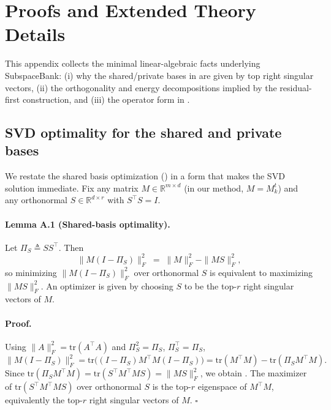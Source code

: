 \documentclass{article}
\theoremstyle{plain}
\theoremstyle{definition}
\theoremstyle{remark}
\begin{document}
\section{Proofs and Extended Theory Details}
\label{sec:appendix-theory}

This appendix collects the minimal linear-algebraic facts underlying SubspaceBank: (i) why the shared/private bases in  are given by top right singular vectors, (ii) the orthogonality and energy decompositions implied by the residual-first construction, and (iii) the operator form in .

\subsection{SVD optimality for the shared and private bases}
\label{sec:appendix-svd-opt}

We restate the shared basis optimization () in a form that makes the SVD solution immediate. Fix any matrix $M\in\mathbb{R}^{m\times d}$ (in our method, $M=M_k^t$) and any orthonormal $S\in\mathbb{R}^{d\times r}$ with $S^\top S=I$.

\paragraph{Lemma A.1 (Shared-basis optimality).}
Let $\Pi_S \triangleq SS^\top$. Then
\begin{equation}
\|M(I-\Pi_S)\|_F^2 \;=\; \|M\|_F^2 - \|MS\|_F^2,
\label{eq:appendix-pythag-ms}
\end{equation}
so minimizing $\|M(I-\Pi_S)\|_F^2$ over orthonormal $S$ is equivalent to maximizing $\|MS\|_F^2$. An optimizer is given by choosing $S$ to be the top-$r$ right singular vectors of $M$.

\paragraph{Proof.}
Using $\|A\|_F^2=\mathrm{tr}(A^\top A)$ and $\Pi_S^2=\Pi_S$, $\Pi_S^\top=\Pi_S$,
\[
\|M(I-\Pi_S)\|_F^2
= \mathrm{tr}\!\big((I-\Pi_S)M^\top M(I-\Pi_S)\big)
= \mathrm{tr}(M^\top M) - \mathrm{tr}(\Pi_S M^\top M).
\]
Since $\mathrm{tr}(\Pi_S M^\top M)=\mathrm{tr}(S^\top M^\top M S)=\|MS\|_F^2$, we obtain . The maximizer of $\mathrm{tr}(S^\top M^\top M S)$ over orthonormal $S$ is the top-$r$ eigenspace of $M^\top M$, equivalently the top-$r$ right singular vectors of $M$. \hfill$\square$
\end{document}
